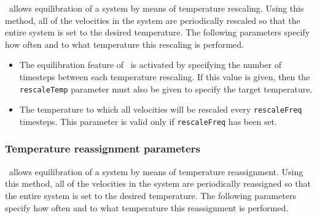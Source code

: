 \NAMD\ allows equilibration of a system by means of temperature 
rescaling.  Using this method, all of the velocities in the system 
are periodically rescaled so that the entire system is set to the 
desired temperature.  The following parameters specify how often 
and to what temperature this rescaling is performed.  

\begin{itemize}

\item
{}
{The equilibration feature of \NAMD\ is activated by 
specifying the number of timesteps between each temperature rescaling.  
If this value is given, then the {\tt rescaleTemp} parameter must also 
be given to specify the target temperature. }

\item
{}
{The temperature to which all velocities will be rescaled
every {\tt rescaleFreq} timesteps.  
This parameter is valid only if {\tt rescaleFreq} has been set.}

\end{itemize}

\subsubsection{Temperature reassignment parameters}

\NAMD\ allows equilibration of a system by means of temperature 
reassignment.  Using this method, all of the velocities in the system 
are periodically reassigned so that the entire system is set to the 
desired temperature.  The following parameters specify how often 
and to what temperature this reassignment is performed.  

